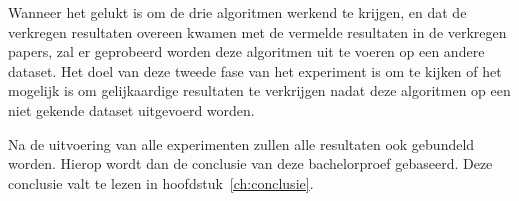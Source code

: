 Wanneer het gelukt is om de drie algoritmen werkend te krijgen, en dat de verkregen resultaten overeen kwamen met de vermelde resultaten in de verkregen papers, zal er geprobeerd worden deze algoritmen uit te voeren op een andere dataset. Het doel van deze tweede fase van het experiment is om te kijken of het mogelijk is om gelijkaardige resultaten te verkrijgen nadat deze algoritmen op een niet gekende dataset uitgevoerd worden.

Na de uitvoering van alle experimenten zullen alle resultaten ook gebundeld worden. Hierop wordt dan de conclusie van deze bachelorproef gebaseerd. Deze conclusie valt te lezen in hoofdstuk~\ref{ch:conclusie}.